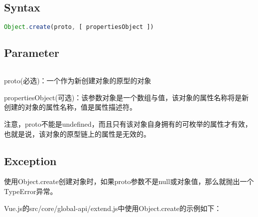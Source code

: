 \subsection{Syntax}


\begin{lstlisting}[language=JavaScript]
Object.create(proto, [ propertiesObject ])
\end{lstlisting}


\subsection{Parameter}


\begin{lstlisting}[language=JavaScript]

\end{lstlisting}


\begin{compactitem}
\item proto(必选)：一个作为新创建对象的原型的对象
\item propertiesObject(可选)：该参数对象是一个数组与值，该对象的属性名称将是新创建的对象的属性名称，值是属性描述符。
\end{compactitem}

注意，proto不能是undefined，而且只有该对象自身拥有的可枚举的属性才有效，也就是说，该对象的原型链上的属性是无效的。

\subsection{Exception}

使用Object.create创建对象时，如果proto参数不是null或对象值，那么就抛出一个TypeError异常。



Vue.js的src/core/global-api/extend.js中使用Object.create的示例如下：




